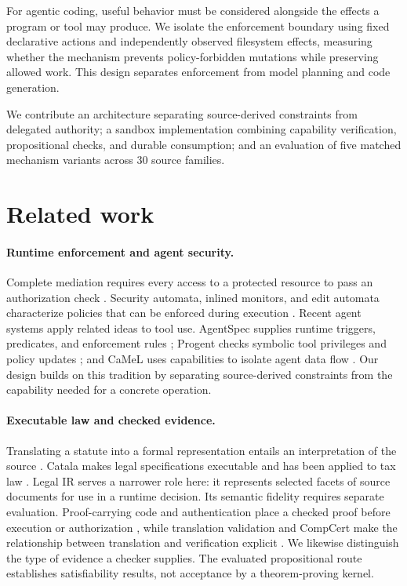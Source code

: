 \documentclass{article}
\begin{document}
For agentic coding, useful behavior must be considered alongside the effects a program or tool may produce. We isolate the enforcement boundary using fixed declarative actions and independently observed filesystem effects, measuring whether the mechanism prevents policy-forbidden mutations while preserving allowed work. This design separates enforcement from model planning and code generation.

We contribute an architecture separating source-derived constraints from delegated authority; a sandbox implementation combining capability verification, propositional checks, and durable consumption; and an evaluation of five matched mechanism variants across 30 source families.


\section{Related work}
\label{sec:related}

\paragraph{Runtime enforcement and agent security.}
Complete mediation requires every access to a protected resource to pass an authorization check \citep{saltzer1975protection}. Security automata, inlined monitors, and edit automata characterize policies that can be enforced during execution \citep{schneider2000enforceable,erlingsson2000irm,ligatti2005edit,hamlen2006enforcement}. Recent agent systems apply related ideas to tool use. AgentSpec supplies runtime triggers, predicates, and enforcement rules \citep{wang2025agentspec}; Progent checks symbolic tool privileges and policy updates \citep{shi2025progent}; and CaMeL uses capabilities to isolate agent data flow \citep{debenedetti2025camel}. Our design builds on this tradition by separating source-derived constraints from the capability needed for a concrete operation.

\paragraph{Executable law and checked evidence.}
Translating a statute into a formal representation entails an interpretation of the source \citep{sergot1986bna,prakken2015lawlogic,benzmueller2020logikey}. Catala makes legal specifications executable and has been applied to tax law \citep{catala,merigoux2021tax}. Legal IR serves a narrower role here: it represents selected facets of source documents for use in a runtime decision. Its semantic fidelity requires separate evaluation. Proof-carrying code and authentication place a checked proof before execution or authorization \citep{necula1997pcc,appel1999pca}, while translation validation and CompCert make the relationship between translation and verification explicit \citep{pnueli1998translation,leroy2009compcert}. We likewise distinguish the type of evidence a checker supplies. The evaluated propositional route establishes satisfiability results, not acceptance by a theorem-proving kernel.
\end{document}
